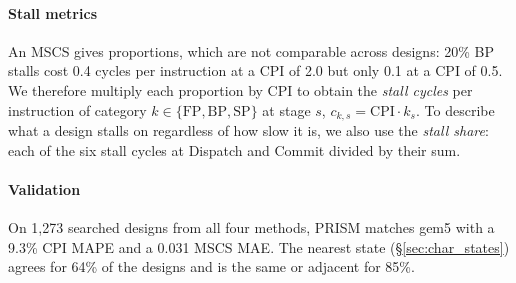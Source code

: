 \paragraph{Stall metrics}
An MSCS gives proportions, which are not comparable across designs: 20\% BP stalls cost 0.4 cycles per instruction at a CPI of 2.0 but only 0.1 at a CPI of 0.5.
%
We therefore multiply each proportion by CPI to obtain the \emph{stall cycles} per instruction of category $k \in \{\mathrm{FP}, \mathrm{BP}, \mathrm{SP}\}$ at stage $s$, $c_{k,s} = \mathrm{CPI}\cdot k_s$.
%
To describe what a design stalls on regardless of how slow it is, we also use the \emph{stall share}: each of the six stall cycles at Dispatch and Commit divided by their sum.

\paragraph{Validation}
On 1,273 searched designs from all four methods, PRISM matches gem5 with a 9.3\% CPI MAPE and a 0.031 MSCS MAE.
%
The nearest state (\S\ref{sec:char_states}) agrees for 64\% of the designs and is the same or adjacent for 85\%.
